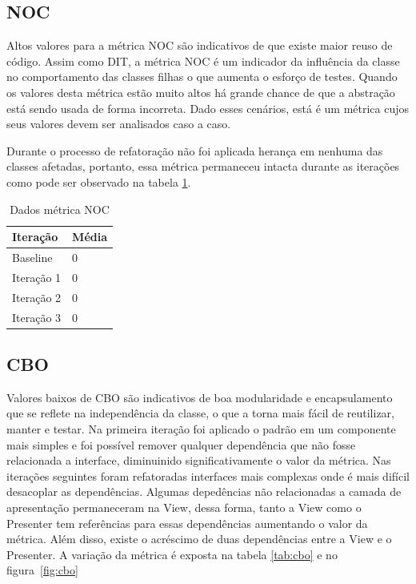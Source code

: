 \subsection{NOC}

Altos valores para a métrica NOC são indicativos de que existe maior reuso de
código. Assim como DIT, a métrica NOC é um indicador da influência da classe
no comportamento das classes filhas o que aumenta o esforço de testes. Quando os
valores desta métrica estão muito altos há grande chance de que a abstração está
sendo usada de forma incorreta. Dado esses cenários, está é um métrica cujos
seus valores devem ser analisados caso a caso.

Durante o processo de refatoração não foi aplicada herança em nenhuma das
classes afetadas, portanto, essa métrica permaneceu intacta durante as iterações
como pode ser observado na tabela \ref{tab:noc}. %

\begin{table}[!h]
	\centering
	    \caption{Dados métrica NOC}
    \begin{tabular}{ | l | l | }
    \hline
    Iteração & Média 			\\ \hline
    Baseline & 0  	\\ \hline
    Iteração 1 & 0			\\ \hline
	Iteração 2 & 0				\\ \hline
	Iteração 3 & 0	\\ \hline
    \end{tabular}
    \label{tab:noc}
\end{table}


\subsection{CBO}

Valores baixos de CBO são indicativos de boa modularidade e encapsulamento que
se reflete na independência da classe, o que a torna mais fácil de reutilizar,
manter e testar.
Na primeira iteração foi aplicado o padrão em um componente mais simples e foi
possível remover qualquer dependência que não fosse relacionada a interface,
diminuinido significativamente o valor da métrica. Nas iterações seguintes foram
refatoradas interfaces mais complexas onde é mais difícil desacoplar as
dependências. Algumas depedências não relacionadas a camada de apresentação
permaneceram na View, dessa forma, tanto a View como o Presenter tem referências
para essas dependências aumentando o valor da métrica. Além disso, existe o
acréscimo de duas dependências entre a View e o Presenter. A variação da métrica
é exposta na tabela \ref{tab:cbo} e no figura~\ref{fig:cbo}

